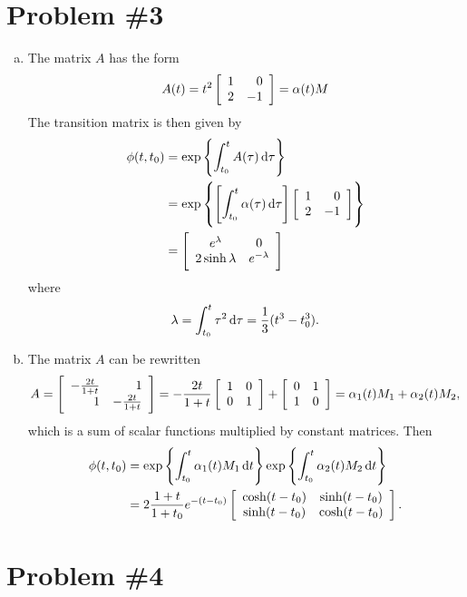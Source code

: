\documentclass{article}
\begin{document}
\section*{Problem \#3}
\begin{enumerate}[(a)]
  \item{
    The matrix $A$ has the form
    $$
      A(t)
    = t^2
      \left[\begin{array}{r r}
        1 &  0 \\
        2 & -1
      \end{array}\right]
    = \alpha(t) M
    $$
    The transition matrix is then given by
    \begin{align*}
         \phi(t, t_0)
      &= \exp\left\{
           \int_{t_0}^{t} A(\tau) \dif\tau
         \right\} \\
      &= \exp\left\{
           \left[
             \int_{t_0}^t \alpha(\tau) \dif\tau
           \right]
           \left[\begin{array}{r r}
             1 &  0 \\
             2 & -1
           \end{array}\right]
         \right\} \\
      &= \left[\begin{array}{c c}
           e^\lambda         & 0 \\
           2 \sinh \lambda & e^{-\lambda}
         \end{array}\right]
    \end{align*}
    where
    $$
      \lambda
    = \int_{t_0}^{t} \tau^2 \dif\tau
    = \frac{1}{3}(t^3 - t_0^3).
    $$
  }
  \item{
    The matrix $A$ can be rewritten
    $$
    A
    =
    \left[\begin{array}{r r}
      -\frac{2t}{1 + t} & 1                 \\
       1                & -\frac{2t}{1 + t}
    \end{array}\right]
    =
    -\frac{2t}{1 + t}
    \left[\begin{array}{r r}
       1 & 0 \\
       0 & 1
    \end{array}\right]
    +
    \left[\begin{array}{r r}
       0 & 1 \\
       1 & 0
    \end{array}\right]
    =
    \alpha_1(t) M_1 + \alpha_2(t) M_2,
    $$
    which is a sum of scalar functions multiplied by constant
    matrices. Then
    \begin{align*}
    \phi(t, t_0)
    &=
    \exp \left\{
      \int_{t_0}^{t} \alpha_1(t) M_1 \dif t
    \right\}
    \exp \left\{
      \int_{t_0}^{t} \alpha_2(t) M_2 \dif t
    \right\} \\
    &=
    2\frac{1 + t}{1 + t_0}e^{-(t - t_0)}
    \left[\begin{array}{c c}
       \cosh (t - t_0) & \sinh (t - t_0) \\
       \sinh (t - t_0) & \cosh (t - t_0)
    \end{array}\right].
    \end{align*}
  }
\end{enumerate}

\section*{Problem \#4}
\end{document}
